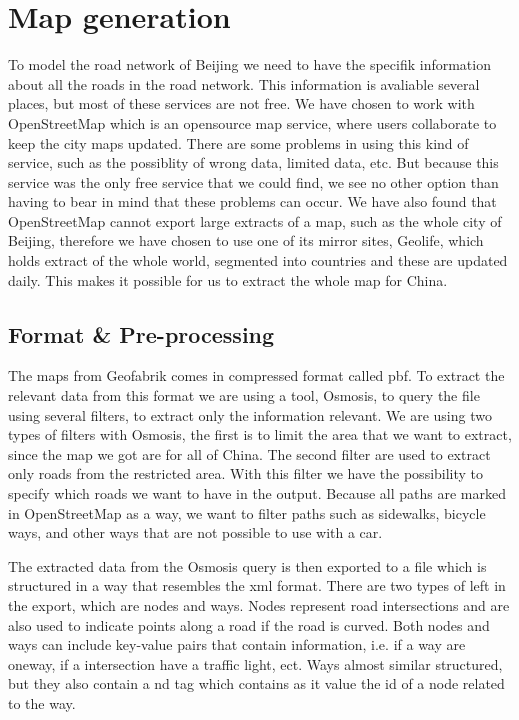\section{Map generation}
To model the road network of Beijing we need to have the specifik information about all the roads in the road network. This information is avaliable several places, but most of these services are not free. We have chosen to work with OpenStreetMap which is an opensource map service, where users collaborate to keep the city maps updated. There are some problems in using this kind of service, such as the possiblity of wrong data, limited data, etc. But because this service was the only free service that we could find, we see no other option than having to bear in mind that these problems can occur. We have also found that OpenStreetMap cannot export large extracts of a map, such as the whole city of Beijing, therefore we have chosen to use one of its mirror sites, Geolife, which holds extract of the whole world, segmented into countries and these are updated daily. This makes it possible for us to extract the whole map for China.

\subsection{Format \& Pre-processing}
The maps from Geofabrik comes in compressed format called pbf. To extract the relevant data from this format we are using a tool, Osmosis, to query the file using several filters, to extract only the information relevant.
We are using two types of filters with Osmosis, the first is to limit the area that we want to extract, since the map we got are for all of China. The second filter are used to extract only roads from the restricted area.
With this filter we have the possibility to specify which roads we want to have in the output. Because all paths are marked in OpenStreetMap as a way, we want to filter paths such as sidewalks, bicycle ways, and other ways that are not possible to use with a car.

The extracted data from the Osmosis query is then exported to a file which is structured in a way that resembles the xml format. There are two types of left in the export, which are nodes and ways. Nodes represent road intersections and are also used to indicate points along a road if the road is curved. Both nodes and ways can include key-value pairs that contain information, i.e. if a way are oneway, if a intersection have a traffic light, ect.
Ways almost similar structured, but they also contain a nd tag which contains as it value the id of a node related to the way. 

